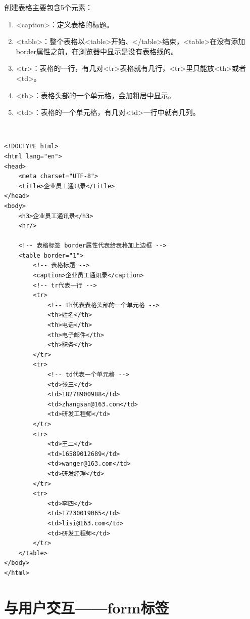 创建表格主要包含5个元素：

\begin{enumerate}
	\item <caption>：定义表格的标题。

	\item <table>：整个表格以<table>开始、</table>结束，<table>在没有添加border属性之前，在浏览器中显示是没有表格线的。

	\item <tr>：表格的一行，有几对<tr>表格就有几行，<tr>里只能放<th>或者<td>。

	\item <th>：表格头部的一个单元格，会加粗居中显示。

	\item <td>：表格的一个单元格，有几对<td>一行中就有几列。
\end{enumerate}

\vspace{0.5cm}

\\

\begin{lstlisting}[style=htmlcssjs]
<!DOCTYPE html>
<html lang="en">
<head>
    <meta charset="UTF-8">
    <title>企业员工通讯录</title>
</head>
<body>
    <h3>企业员工通讯录</h3>
    <hr/>

    <!-- 表格标签 border属性代表给表格加上边框 -->
    <table border="1">
        <!-- 表格标题 -->
        <caption>企业员工通讯录</caption>
        <!-- tr代表一行 -->
        <tr>
            <!-- th代表表格头部的一个单元格 -->
            <th>姓名</th>
            <th>电话</th>
            <th>电子邮件</th>
            <th>职务</th>
        </tr>
        <tr>
            <!-- td代表一个单元格 -->
            <td>张三</td>
            <td>18278900988</td>
            <td>zhangsan@163.com</td>
            <td>研发工程师</td>
        </tr>
        <tr>
            <td>王二</td>
            <td>16589012689</td>
            <td>wanger@163.com</td>
            <td>研发经理</td>
        </tr>
        <tr>
            <td>李四</td>
            <td>17230019065</td>
            <td>lisi@163.com</td>
            <td>研发工程师</td>
        </tr>
    </table>
</body>
</html>
\end{lstlisting}

\newpage

\section{与用户交互——form标签}

